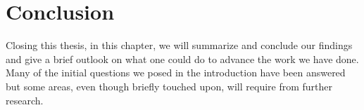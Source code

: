 
\iffalse
\fi

\chapter{Conclusion}\label{chap:conclusion}

Closing this thesis, in this chapter, we will summarize and conclude our findings 
and give a brief outlook on what one could do to advance the work we have done.
Many of the initial questions we posed in the introduction have been answered
but some areas, even though briefly touched upon, will require from further research.


